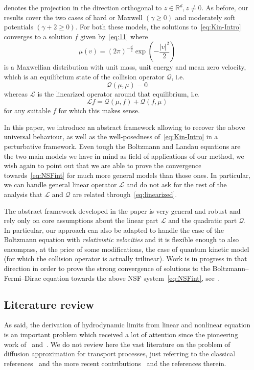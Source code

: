 \documentclass[AHL,Unicode,longabstracts,published]{cedram}
\newcommand{\R}{\mathbb{R}}
\newcommand{\LL}{\mathcal{L}}
\newcommand{\QQ}{\mathcal{Q}}
\renewcommand*\ge{\geqslant}
\begin{document}
denotes the projection in the direction orthogonal to $z \in \R^{d},z\neq 0$. As before, our results cover the two cases of hard {or Maxwell $(\gamma \ge 0)$ and moderately soft potentials $(\gamma + 2 \ge 0)$}. For both these models, the solutions to~\eqref{eq:Kin-Intro} converges to a solution $f$ given by~\eqref{eq:11} where
\[
\mu(v)=(2\pi)^{-\frac{d}{2}}\exp\left(-\frac{|v|^{2}}{2}\right)
\]
is a Maxwellian distribution with {unit mass, unit energy and mean zero velocity}, which is an equilibrium state of the collision operator $\QQ$, i.e.
\[
\QQ(\mu,\mu)=0
\]
whereas $\LL$ is the linearized operator around that equilibrium, i.e.
\begin{equation}\label{eq:linearized}
\LL f=\QQ(\mu,f)+\QQ(f,\mu)
\end{equation}
for any suitable $f$ for which this makes sense.
\medskip


In this paper, we introduce an abstract framework allowing to recover the above universal behaviour, as well as the well-posedness of~\eqref{eq:Kin-Intro} in a perturbative framework. Even tough the Boltzmann and Landau equations are the two main models we have in mind as field of applications of our method, we wish again to point out that we are able to prove the convergence towards~\eqref{eq:NSFint} for much more general models than those ones. In particular, we can handle general linear operator $\LL$ and do not ask for the rest of the analysis that $\LL$ and $\QQ$ are related through~\eqref{eq:linearized}.

The abstract framework developed in the paper is very general and robust and rely only on core assumptions about the linear part $\LL$ and the quadratic part $\QQ$. In particular, our approach can also be adapted to handle the case of the Boltzmann equation with \emph{relativistic velocities} and it is flexible enough to also encompass, at the price of some modifications, the case of quantum kinetic model (for which the collision operator is actually trilinear). Work is in progress in that direction in order to prove the strong convergence of solutions to the Boltzmann--Fermi--Dirac equation towards the above NSF system~\eqref{eq:NSFint}, see~\cite{GL2023}.


\subsection{Literature review}

As said, the derivation of hydrodynamic limits from linear and nonlinear equation is an important problem which received a lot of attention since the pioneering work of~\cite{H1912} and~\cite{E1917}. We do not review here the vast literature on the problem of diffusion approximation for transport processes, just referring to the classical references~\cite{BLP1979,BSS} and the more recent contributions~\cite{BM,GW} and the references therein.
\end{document}
